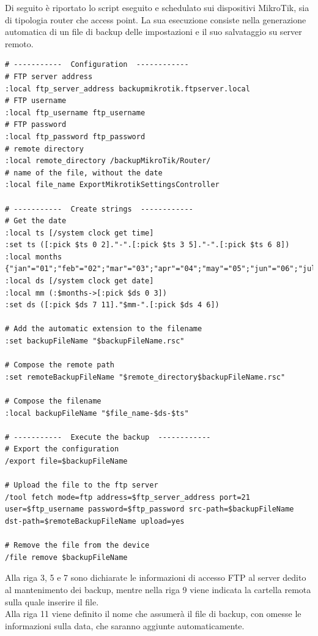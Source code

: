 \documentclass[Tesi.tex]{subfiles}
\begin{document}
Di seguito è riportato lo script eseguito e schedulato sui dispositivi MikroTik, sia di tipologia router che access point. La sua esecuzione consiste nella generazione automatica di un file di backup delle impostazioni e il suo salvataggio su server  remoto.

\begin{lstlisting}[caption=Script per il backup dei device MikroTik]
# -----------  Configuration  ------------
# FTP server address
:local ftp_server_address backupmikrotik.ftpserver.local
# FTP username
:local ftp_username ftp_username
# FTP password
:local ftp_password ftp_password
# remote directory
:local remote_directory /backupMikroTik/Router/
# name of the file, without the date
:local file_name ExportMikrotikSettingsController

# -----------  Create strings  ------------
# Get the date
:local ts [/system clock get time]
:set ts ([:pick $ts 0 2]."-".[:pick $ts 3 5]."-".[:pick $ts 6 8])
:local months {"jan"="01";"feb"="02";"mar"="03";"apr"="04";"may"="05";"jun"="06";"jul"="07";"aug"="08";"sep"="09";"oct"="10";"nov"="11";"dec"="12"};
:local ds [/system clock get date]
:local mm (:$months->[:pick $ds 0 3])
:set ds ([:pick $ds 7 11]."$mm-".[:pick $ds 4 6])

# Add the automatic extension to the filename
:set backupFileName "$backupFileName.rsc"

# Compose the remote path
:set remoteBackupFileName "$remote_directory$backupFileName.rsc"

# Compose the filename
:local backupFileName "$file_name-$ds-$ts"

# -----------  Execute the backup  ------------
# Export the configuration
/export file=$backupFileName

# Upload the file to the ftp server
/tool fetch mode=ftp address=$ftp_server_address port=21 user=$ftp_username password=$ftp_password src-path=$backupFileName dst-path=$remoteBackupFileName upload=yes

# Remove the file from the device
/file remove $backupFileName
\end{lstlisting}

Alla riga 3, 5 e 7 sono dichiarate le informazioni di accesso FTP al server dedito al mantenimento dei backup, mentre nella riga 9 viene indicata la cartella remota sulla quale inserire il file.\\
Alla riga 11 viene definito il nome che assumerà il file di backup, con omesse le informazioni sulla data, che saranno aggiunte automaticamente. \\
\end{document}
